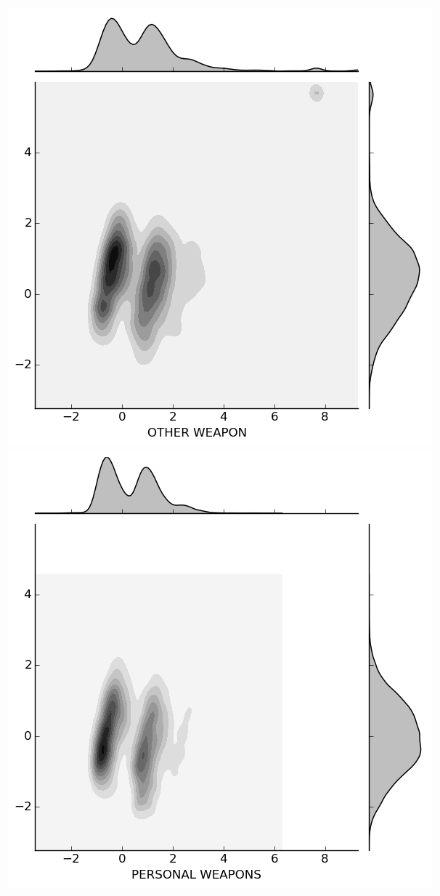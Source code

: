\begin{figure}[H]
\begin{minipage}[b]{0.20\linewidth}
  \end{minipage}
  \quad
  \begin{minipage}[b]{0.20\linewidth}
    \includegraphics[width=\linewidth]{images/weapon/OTHER_WEAPON.png}
  \end{minipage}
  \quad
  \begin{minipage}[b]{0.20\linewidth}
    \includegraphics[width=\linewidth]{images/weapon/PERSONAL_WEAPONS.png}
  \end{minipage}


\end{figure}
